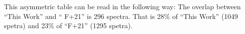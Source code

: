This asymmetric table can be read in the following way: The overlap between ``This Work'' and `` F+21'' is 296 spectra. That is 28\% of ``This Work'' (1049 spetra) and 23\% of ``F+21'' (1295 spetra).
